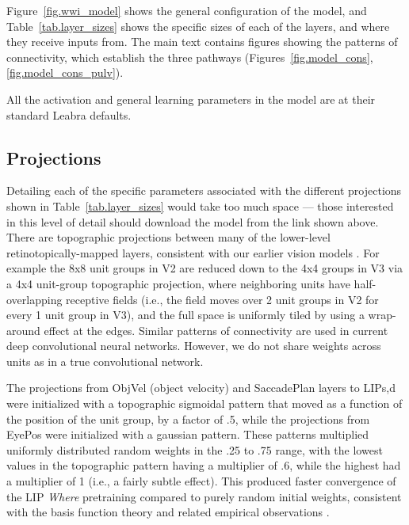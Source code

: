 \documentclass[11pt,twoside]{article}
\newif\myifpdf
\begin{document}
Figure~\ref{fig.wwi_model} shows the general configuration of the model, and Table~\ref{tab.layer_sizes} shows the specific sizes of each of the layers, and where they receive inputs from.  The main text contains figures showing the patterns of connectivity, which establish the three pathways (Figures~\ref{fig.model_cons}, \ref{fig.model_cons_pulv}).

All the activation and general learning parameters in the model are at their standard Leabra defaults.

\subsection{Projections}

Detailing each of the specific parameters associated with the different projections shown in Table~\ref{tab.layer_sizes} would take too much space --- those interested in this level of detail should download the model from the link shown above.  There are topographic projections between many of the lower-level retinotopically-mapped layers, consistent with our earlier vision models \cite{OReillyWyatteHerdEtAl13}.  For example the 8x8 unit groups in V2 are reduced down to the 4x4 groups in V3 via a 4x4 unit-group topographic projection, where neighboring units have half-overlapping receptive fields (i.e., the field moves over 2 unit groups in V2 for every 1 unit group in V3), and the full space is uniformly tiled by using a wrap-around effect at the edges.  Similar patterns of connectivity are used in current deep convolutional neural networks.  However, we do not share weights across units as in a true convolutional network.

The projections from ObjVel (object velocity) and SaccadePlan layers to LIPs,d were initialized with a topographic sigmoidal pattern that moved as a function of the position of the unit group, by a factor of .5, while the projections from EyePos were initialized with a gaussian pattern.  These patterns multiplied uniformly distributed random weights in the .25 to .75 range, with the lowest values in the topographic pattern having a multiplier of .6, while the highest had a multiplier of 1 (i.e., a fairly subtle effect).  This produced faster convergence of the LIP {\em Where} pretraining compared to purely random initial weights, consistent with the basis function theory and related empirical observations \cite{ZipserAndersen88,PougetSejnowski97}.
\end{document}
